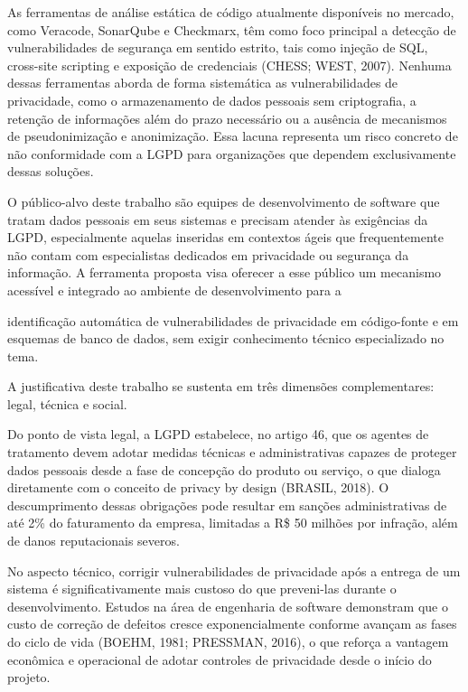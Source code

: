 \documentclass[oneside]{normas-utf-tex}
\begin{document}
As ferramentas de análise estática de código atualmente disponíveis no mercado, como Veracode, SonarQube e Checkmarx, têm como foco principal a detecção de vulnerabilidades de segurança em sentido estrito, tais como injeção de SQL, cross-site scripting e exposição de credenciais (CHESS; WEST, 2007). Nenhuma dessas ferramentas aborda de forma sistemática as vulnerabilidades de privacidade, como o armazenamento de dados pessoais sem criptografia, a retenção de informações além do prazo necessário ou a ausência de mecanismos de pseudonimização e anonimização. Essa lacuna representa um risco concreto de não conformidade com a LGPD para organizações que dependem exclusivamente dessas soluções.

O público-alvo deste trabalho são equipes de desenvolvimento de software que tratam dados pessoais em seus sistemas e precisam atender às exigências da LGPD, especialmente aquelas inseridas em contextos ágeis que frequentemente não contam com especialistas dedicados em privacidade ou segurança da informação. A ferramenta proposta visa oferecer a esse público um mecanismo acessível e integrado ao ambiente de desenvolvimento para a

identificação automática de vulnerabilidades de privacidade em código-fonte e em esquemas de banco de dados, sem exigir conhecimento técnico especializado no tema.

A justificativa deste trabalho se sustenta em três dimensões complementares: legal, técnica e social.

Do ponto de vista legal, a LGPD estabelece, no artigo 46, que os agentes de tratamento devem adotar medidas técnicas e administrativas capazes de proteger dados pessoais desde a fase de concepção do produto ou serviço, o que dialoga diretamente com o conceito de privacy by design (BRASIL, 2018). O descumprimento dessas obrigações pode resultar em sanções administrativas de até 2\% do faturamento da empresa, limitadas a R\$ 50 milhões por infração, além de danos reputacionais severos.

No aspecto técnico, corrigir vulnerabilidades de privacidade após a entrega de um sistema é significativamente mais custoso do que preveni-las durante o desenvolvimento. Estudos na área de engenharia de software demonstram que o custo de correção de defeitos cresce exponencialmente conforme avançam as fases do ciclo de vida (BOEHM, 1981; PRESSMAN, 2016), o que reforça a vantagem econômica e operacional de adotar controles de privacidade desde o início do projeto.
\end{document}
